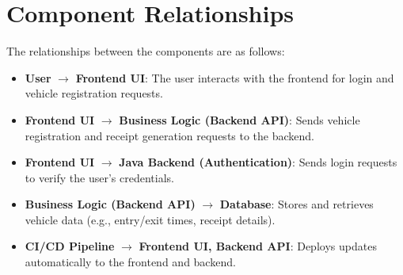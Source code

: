 \section*{Component Relationships}

The relationships between the components are as follows:

\begin{itemize}
    \item \textbf{User} $\to$ \textbf{Frontend UI}: The user interacts with the frontend for login and vehicle registration requests.
    \item \textbf{Frontend UI} $\to$ \textbf{Business Logic (Backend API)}: Sends vehicle registration and receipt generation requests to the backend.
    \item \textbf{Frontend UI} $\to$ \textbf{Java Backend (Authentication)}: Sends login requests to verify the user's credentials.
    \item \textbf{Business Logic (Backend API)} $\to$ \textbf{Database}: Stores and retrieves vehicle data (e.g., entry/exit times, receipt details).
    \item \textbf{CI/CD Pipeline} $\to$ \textbf{Frontend UI, Backend API}: Deploys updates automatically to the frontend and backend.
\end{itemize}
